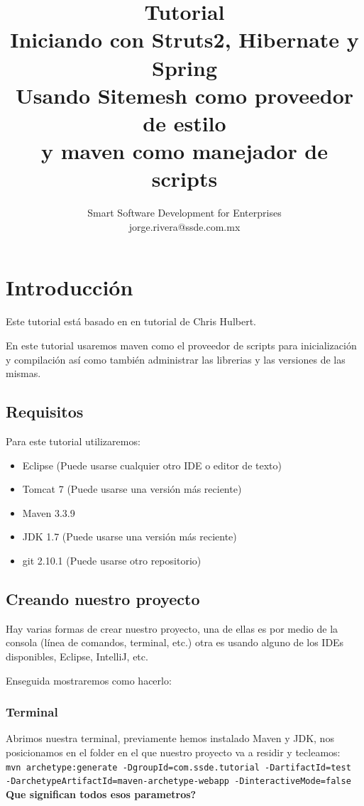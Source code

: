 \documentclass[12pt,a4paper]{article}
\title{Tutorial\\Iniciando con Struts2, Hibernate y Spring\\Usando Sitemesh como proveedor de estilo\\y maven como manejador de scripts}
\author{Smart Software Development for Enterprises\\jorge.rivera@ssde.com.mx}
\begin{document}
\maketitle
\newpage
\tableofcontents
\newpage
\listoffigures
\newpage

    \section{Introducci\'on}
		Este tutorial est\'a basado en en tutorial de Chris Hulbert.\\ \par
		En este tutorial usaremos maven como el proveedor de scripts para inicializaci\'on y compilaci\'on as\'i como tambi\'en administrar las librerias y las versiones de las mismas.\\
		\subsection{Requisitos}
		Para este tutorial utilizaremos:
		\begin{itemize}
		\item Eclipse (Puede usarse cualquier otro IDE o editor de texto)
		\item Tomcat 7 (Puede usarse una versi\'on m\'as reciente)
		\item Maven 3.3.9
		\item JDK 1.7 (Puede usarse una versi\'on m\'as reciente)
		\item git 2.10.1 (Puede usarse otro repositorio)
		\end{itemize}

		\subsection{Creando nuestro proyecto}
		Hay varias formas de crear nuestro proyecto, una de ellas es por medio de la consola (l\'inea 
		de comandos, terminal, etc.) otra es usando alguno de los IDEs disponibles, Eclipse, IntelliJ,
		etc.\\ \par
		Enseguida mostraremos como hacerlo:

		\subsubsection{Terminal}
		
		Abrimos nuestra terminal, previamente hemos instalado Maven y JDK, nos posicionamos en el folder
		en el que nuestro proyecto va a residir y tecleamos:\\
		\linebreak
		\texttt{mvn archetype:generate -DgroupId=com.ssde.tutorial -DartifactId=test \\-DarchetypeArtifactId=maven-archetype-webapp -DinteractiveMode=false}\\
		\textbf{Que significan todos esos parametros?}
\end{document}
